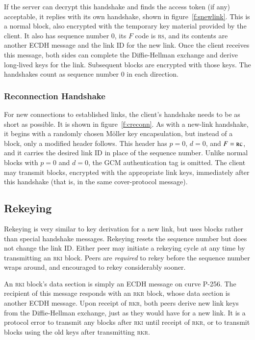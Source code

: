If the server can decrypt this handshake and finds the access token
(if any) acceptable, it replies with its own handshake, shown in
figure~\ref{f:snewlink}.  This is a normal block, also encrypted with
the temporary key material provided by the client.  It also has
sequence number 0, its $F$ code is \textsc{rs}, and its contents are
another ECDH message and the link ID for the new link.  Once the
client receives this message, both sides can complete the
Diffie-Hellman exchange and derive long-lived keys for the link.
Subsequent blocks are encrypted with those keys.  The handshakes count
as sequence number 0 in each direction.

\subsubsection{Reconnection Handshake}

For new connections to established links, the client's handshake needs
to be as short as possible.  It is shown in figure~\ref{f:creconn}.
As with a new-link handshake, it begins with a randomly chosen Möller
key encapsulation, but instead of a block, only a modified header
follows.  This header has $p=0$, $d=0$, and $F=\text{\textsc{rc}}$,
and it carries the desired link ID in place of the sequence number.
Unlike normal blocks with $p=0$ and $d=0$, the GCM authentication tag
is omitted.  The client may transmit blocks, encrypted with the
appropriate link keys, immediately after this handshake (that is, in
the same cover-protocol message).

\subsection{Rekeying}\label{s:rekey}

Rekeying is very similar to key derivation for a new link, but uses
blocks rather than special handshake messages.  Rekeying resets the
sequence number but does not change the link ID.  Either peer may
initiate a rekeying cycle at any time by transmitting an
\textsc{rki} block.  Peers are \emph{required} to rekey before the
sequence number wraps around, and encouraged to rekey considerably
sooner.

An \textsc{rki} block's data section is simply an ECDH message on curve
P-256.  The recipient of this message responds with an \textsc{rkr}
block, whose data section is another ECDH message.  Upon receipt of
\textsc{rkr}, both peers derive new link keys from the Diffie-Hellman
exchange, just as they would have for a new link.  It is a protocol
error to transmit any blocks after \textsc{rki} until receipt of
\textsc{rkr}, or to transmit blocks using the old keys after
transmitting \textsc{rkr}.


